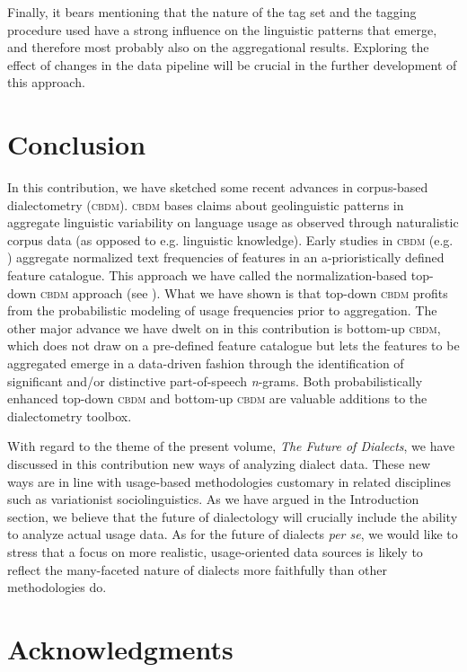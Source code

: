 \documentclass[output=paper]{LSP/langsci}
\begin{document}
Finally, it bears mentioning that the nature of the tag set and the tagging procedure used have a strong influence on the linguistic patterns that emerge, and therefore most probably also on the aggregational results.
Exploring the effect of changes in the data pipeline will be crucial in the further development of this approach.

\section{Conclusion} \label{conclusion}

\largerpage
In this contribution, we have sketched some recent advances in corpus-based dialectometry (\textsc{cbdm}).
\textsc{cbdm} bases claims about geolinguistic patterns in aggregate linguistic variability on language usage as observed through naturalistic corpus data (as opposed to e.g. linguistic knowledge).
Early studies in \textsc{cbdm} (e.g. \citealt{szmrecsanyi_corpus-based_2011}) aggregate normalized text frequencies of features in an a-prioristically defined feature catalogue.
This approach we have called the normalization-based top-down \textsc{cbdm} approach (see ).
What we have shown is that top-down \textsc{cbdm} profits from the probabilistic modeling of usage frequencies prior to aggregation.
The other major advance we have dwelt on in this contribution is bottom-up \textsc{cbdm}, which does not draw on a pre-defined feature catalogue but lets the features to be aggregated emerge in a data-driven fashion through the identification of significant and/or distinctive part-of-speech \emph{n}-grams.
Both probabilistically enhanced top-down \textsc{cbdm} and bottom-up \textsc{cbdm} are valuable additions to the dialectometry toolbox.

With regard to the theme of the present volume, \emph{The Future of Dialects}, we have discussed in this contribution new ways of analyzing dialect data.
These new ways are in line with usage-based methodologies customary in related disciplines such as variationist sociolinguistics. 
As we have argued in the Introduction section, we believe that the future of dialectology will crucially include the ability to analyze actual usage data. 
As for the future of dialects \textit{per se}, we would like to stress that a focus on more realistic, usage-oriented data sources is likely to reflect the many-faceted nature of dialects more faithfully than other methodologies do. 

\section*{Acknowledgments}
\end{document}
